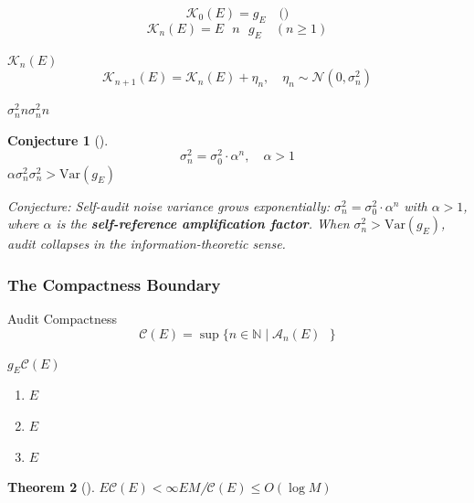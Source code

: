 \documentclass[12pt,a4paper]{article}
\newtheorem{theorem}{Theorem}[section]
\newtheorem{conjecture}[theorem]{Conjecture}
\theoremstyle{remark}
\newcommand{\N}{\mathbb{N}}
\newcommand{\Var}{\mathrm{Var}}
\newcommand{\A}{\mathcal{A}}
\begin{document}
\textbf{}
\begin{equation}
    \mathcal{K}_0(E) = g_E \quad \text{()}
\end{equation}
\begin{equation}
    \mathcal{K}_n(E) = E\text{  }n\text{  }g_E \quad (n \geq 1)
\end{equation}

$\mathcal{K}_n(E)$\textbf{}
\begin{equation}
    \mathcal{K}_{n+1}(E) = \mathcal{K}_n(E) + \eta_n, \quad \eta_n \sim \mathcal{N}(0, \sigma_n^2)
\end{equation}

$\sigma_n^2$$n$$\sigma_n^2$$n$

\begin{conjecture}[]

\begin{equation}
    \sigma_n^2 = \sigma_0^2 \cdot \alpha^n, \quad \alpha > 1
\end{equation}
$\alpha$\textbf{}$\sigma_n^2$$\sigma_n^2 > \Var(g_E)$
\end{conjecture}

\medskip
\noindent\textit{Conjecture: Self-audit noise variance grows exponentially: $\sigma_n^2 = \sigma_0^2 \cdot \alpha^n$ with $\alpha > 1$, where $\alpha$ is the \textbf{self-reference amplification factor}. When $\sigma_n^2 > \Var(g_E)$, audit collapses in the information-theoretic sense.}

\subsubsection{ The Compactness Boundary}

\textbf{}Audit Compactness
\begin{equation}
    \mathcal{C}(E) = \sup\{n \in \N \mid \A_n(E) \text{ }\}
\end{equation}

$g_E$$\mathcal{C}(E)$

\begin{enumerate}[label=(\roman*)]
    \item \textbf{}$E$
    \item \textbf{}$E$
    \item \textbf{}$E$
\end{enumerate}

\begin{theorem}[]
$E$$\mathcal{C}(E) < \infty$$E$$M$/$\mathcal{C}(E) \leq O(\log M)$
\end{theorem}
\end{document}

